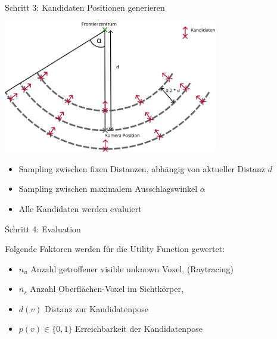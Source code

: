 \documentclass{beamer}
\begin{document}
\begin{frame}{Schritt 3: Kandidaten Positionen generieren}
	\begin{block}{}

		\begin{center}
			\includegraphics[width=0.7\textwidth]{Graphics/view_point_gen_v2.png}
		\end{center}
		\begin{itemize}
			\item Sampling zwischen fixen Distanzen, abhängig von aktueller Distanz $d$
			\item Sampling zwischen maximalem Ausschlagswinkel $\alpha$
			\item Alle Kandidaten werden evaluiert
		\end{itemize}
	\end{block}

\end{frame}

\begin{frame}{Schritt 4: Evaluation}
	\begin{block}{}
		Folgende Faktoren werden für die Utility Function gewertet:
		\begin{itemize}
			\item $n_{u}$ Anzahl getroffener visible unknown Voxel, (Raytracing)
			\item $n_s$ Anzahl Oberflächen-Voxel im Sichtkörper,
			\item $d(v)$ Distanz zur Kandidatenpose
			\item $p(v) \in \{0,1\}$ Erreichbarkeit der Kandidatenpose
		\end{itemize}
	\end{block}
\end{frame}
\end{document}
